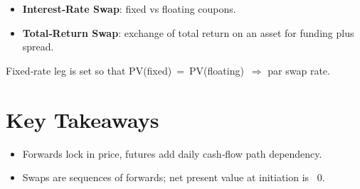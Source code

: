 \begin{itemize}
  \item \textbf{Interest‑Rate Swap}: fixed vs floating coupons.
  \item \textbf{Total‑Return Swap}: exchange of total return on an asset for funding plus spread.
\end{itemize}

Fixed‑rate leg is set so that PV(fixed) = PV(floating) \(\Rightarrow\) par swap rate.

\section*{Key Takeaways}
\begin{itemize}
  \item Forwards lock in price, futures add daily cash‑flow path dependency.
  \item Swaps are sequences of forwards; net present value at initiation is ~0.
\end{itemize}
